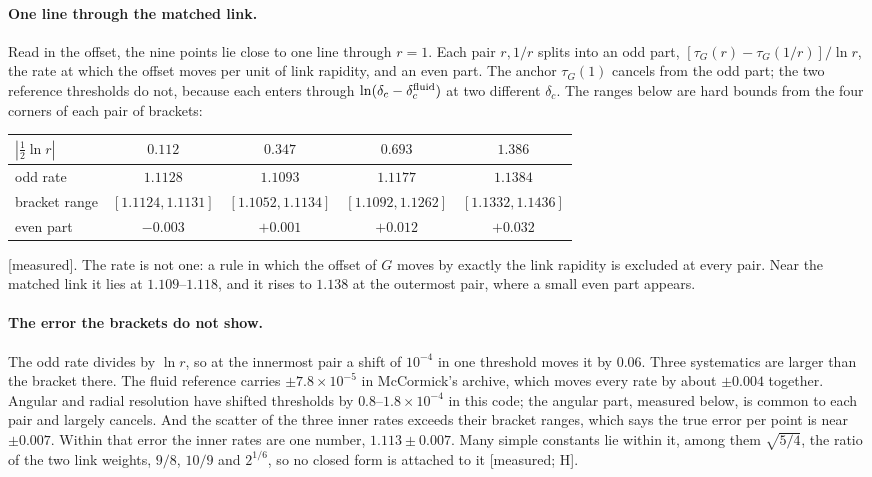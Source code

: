 \documentclass[11pt]{article}
\newcommand{\grade}[1]{\textsf{\small[#1]}}
\begin{document}
\paragraph{One line through the matched link.} Read in the offset, the nine points lie close to one line through $r=1$. Each pair $r,1/r$ splits into an odd part, $[\tau_G(r)-\tau_G(1/r)]/\ln r$, the rate at which the offset moves per unit of link rapidity, and an even part. The anchor $\tau_G(1)$ cancels from the odd part; the two reference thresholds do not, because each enters through $\ln(\delta_c-\delta_c^{\rm fluid})$ at two different $\delta_c$. The ranges below are hard bounds from the four corners of each pair of brackets:
\begin{center}\begin{tabular}{lcccc}\toprule
$|\tfrac12\ln r|$ & $0.112$ & $0.347$ & $0.693$ & $1.386$\\\midrule
odd rate & $1.1128$ & $1.1093$ & $1.1177$ & $1.1384$\\
bracket range & $[1.1124,1.1131]$ & $[1.1052,1.1134]$ & $[1.1092,1.1262]$ & $[1.1332,1.1436]$\\
even part & $-0.003$ & $+0.001$ & $+0.012$ & $+0.032$\\\bottomrule\end{tabular}\end{center}
\grade{measured}. The rate is not one: a rule in which the offset of $G$ moves by exactly the link rapidity is excluded at every pair. Near the matched link it lies at $1.109$--$1.118$, and it rises to $1.138$ at the outermost pair, where a small even part appears.

\paragraph{The error the brackets do not show.} The odd rate divides by $\ln r$, so at the innermost pair a shift of $10^{-4}$ in one threshold moves it by $0.06$. Three systematics are larger than the bracket there. The fluid reference carries $\pm7.8\times10^{-5}$ in McCormick's archive, which moves every rate by about $\pm0.004$ together. Angular and radial resolution have shifted thresholds by $0.8$--$1.8\times10^{-4}$ in this code; the angular part, measured below, is common to each pair and largely cancels. And the scatter of the three inner rates exceeds their bracket ranges, which says the true error per point is near $\pm0.007$. Within that error the inner rates are one number, $1.113\pm0.007$. Many simple constants lie within it, among them $\sqrt{5/4}$, the ratio of the two link weights, $9/8$, $10/9$ and $2^{1/6}$, so no closed form is attached to it \grade{measured; H}.
\end{document}
